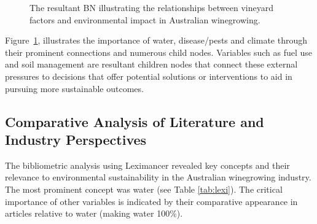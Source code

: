 % 
\begin{figure}[h!]
    \centering
    \caption{The resultant BN illustrating the relationships between vineyard factors and environmental impact in Australian winegrowing.}\label{fig:generalBN}
\end{figure}


Figure~\ref{fig:generalBN}, illustrates the importance of water, disease/pests and climate through their prominent connections and numerous child nodes. Variables such as fuel use and soil management are resultant children nodes that connect these external pressures to decisions that offer potential solutions or interventions to aid in pursuing more sustainable outcomes.

\subsection{Comparative Analysis of Literature and Industry Perspectives}


The bibliometric analysis using Leximancer revealed key concepts and their relevance to environmental sustainability in the Australian winegrowing industry. The most prominent concept was water (see Table \ref{tab:lexi}). The critical importance of other variables is indicated by their comparative appearance in articles relative to water (making water 100\%).


